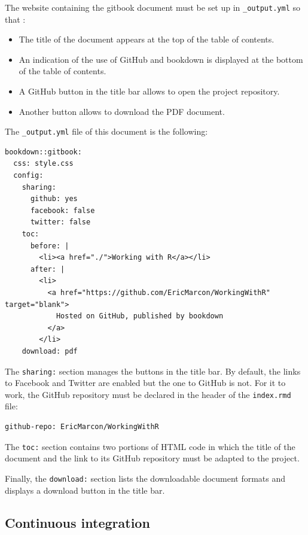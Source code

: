 \documentclass[
  12pt,
  american,
  a4paper,
  extrafontsizes,onecolumn,openright
  ]{memoir}
\providecommand{\tightlist}{%
  \setlength{\itemsep}{0pt}\setlength{\parskip}{0pt}}
\begin{document}
The website containing the gitbook document must be set up in \texttt{\_output.yml} so that :

\begin{itemize}
\tightlist
\item
  The title of the document appears at the top of the table of contents.
\item
  An indication of the use of GitHub and bookdown is displayed at the bottom of the table of contents.
\item
  A GitHub button in the title bar allows to open the project repository.
\item
  Another button allows to download the PDF document.
\end{itemize}

The \texttt{\_output.yml} file of this document is the following:

\begin{verbatim}
bookdown::gitbook:
  css: style.css
  config:
    sharing:
      github: yes
      facebook: false
      twitter: false
    toc:
      before: |
        <li><a href="./">Working with R</a></li>
      after: |
        <li>
          <a href="https://github.com/EricMarcon/WorkingWithR" target="blank">
            Hosted on GitHub, published by bookdown
          </a>
        </li>
    download: pdf
\end{verbatim}

The \texttt{sharing:} section manages the buttons in the title bar.
By default, the links to Facebook and Twitter are enabled but the one to GitHub is not.
For it to work, the GitHub repository must be declared in the header of the \texttt{index.rmd} file:

\begin{verbatim}
github-repo: EricMarcon/WorkingWithR
\end{verbatim}

The \texttt{toc:} section contains two portions of HTML code in which the title of the document and the link to its GitHub repository must be adapted to the project.

Finally, the \texttt{download:} section lists the downloadable document formats and displays a download button in the title bar.

\hypertarget{sec:rediger-ouvrage-ci}{%
\subsection{Continuous integration}\label{sec:rediger-ouvrage-ci}}
\end{document}
